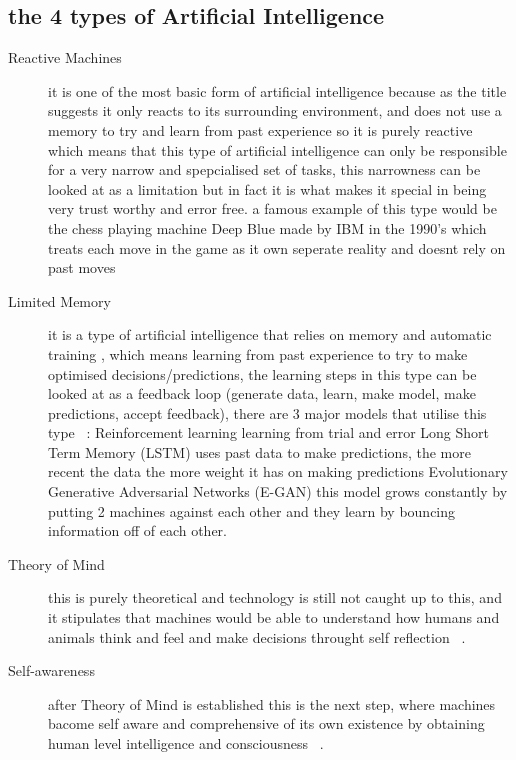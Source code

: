     \subsection{the 4 types of Artificial Intelligence}
        \begin{description} 
        \item[Reactive Machines]
            it is one of the most basic form of artificial intelligence because as the title suggests it only reacts to its surrounding environment, and does not use a memory to try and learn from past experience so it is purely reactive which means that this type of artificial intelligence can only be responsible for a very narrow and spepcialised set of tasks, this narrowness can be looked at as a limitation but in fact it is what makes it special in being very trust worthy and error free. a famous example of this type would be the chess playing machine Deep Blue made by IBM in the 1990's which treats each move in the game as it own seperate reality and doesnt rely on past moves ~\cite{ai}
        \item[Limited Memory]
            it is a type of artificial intelligence that relies on memory and automatic training , which means learning from past experience to try to make optimised decisions/predictions, the learning steps in this type can be looked at as a feedback loop (generate data, learn, make model, make predictions, accept feedback), there are 3 major models that utilise this type ~\cite{ai}: 
                Reinforcement learning
                    learning from trial and error
                Long Short Term Memory (LSTM)
                    uses past data to make predictions, the more recent the data the more weight it has on making predictions
                Evolutionary Generative Adversarial Networks (E-GAN)
                    this model grows constantly by putting 2 machines against each other and they learn by bouncing information off of each other. 
        \item[Theory of Mind]
            this is purely theoretical and technology is still not caught up to this, and it stipulates that machines would be able to understand how humans and animals think and feel and make decisions throught self reflection ~\cite{ai}.
        \item[Self-awareness]
            after Theory of Mind is established this is the next step, where machines bacome self aware and comprehensive of its own existence by obtaining human level intelligence and consciousness ~\cite{ai}.
        \end{description}
    
